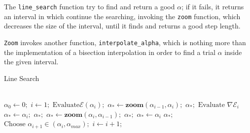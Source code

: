 			The \texttt{line\_search} function try to find and return a good $\alpha$; if it fails, it returns an interval in which continue the searching, invoking the \texttt{zoom} function, which decreases the size of the interval, until it finds and returns a good step length.

			\texttt{Zoom} invokes another function, \texttt{interpolate\_alpha}, which is nothing more than the implementation of a bisection interpolation in order to find a trial $\alpha$ inside the given interval.



			\begin{algorithm}
			\caption{Line Search}\label{linesearch}
			\begin{algorithmic}[1]
			\\
			\State $\alpha_0 \gets \textit{0};$
			\State $i \gets \textit{1};$
			 		\State  $ \text{Evaluate}\mathcal{E}(\alpha_i);$
						\State $\alpha_* \gets \textbf{zoom}(\alpha_{i-1},\alpha_{i});$
						\Return $\alpha_*; $
					\EndIf
					\State   $\text{Evaluate } \nabla\mathcal{E}_{i} $
						\State $\alpha_* \gets \alpha_i; $
						\Return $\alpha_*; $
					\EndIf
						\State $\alpha_* \gets \textbf{zoom}(\alpha_{i},\alpha_{i-1}); $
						\Return $\alpha_*; $
					\EndIf
						\State $\alpha_* \gets\alpha_{i}$
						\Return $\alpha_*;$
					\EndIf
					\State $\text{Choose  } \alpha_{i+1}  \in (\alpha_i, \alpha_{max});$
					\State $i \gets i+1; $
			\EndWhile
			\EndProcedure
			\end{algorithmic}
			\end{algorithm}


